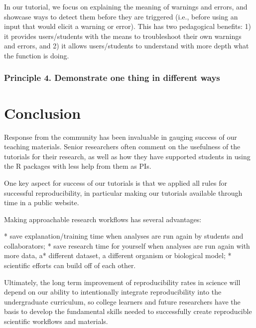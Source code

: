 \documentclass[12pt]{article}
\begin{document}
In our tutorial, we focus on explaining the meaning of warnings and errors, and
 showcase ways to detect them before they are triggered (i.e., before using an input
  that would elicit a warning or error). This has two pedagogical benefits:
1) it provides users/students with the means to troubleshoot their own warnings and errors, and
2) it allows users/students to understand with more depth what the function is doing.





\subsubsection*{Principle 4. Demonstrate one thing in different ways}








\section*{Conclusion}
\label{sec:conclusion}

Response from the community has been invaluable in gauging success of our teaching
materials.
Senior researchers often comment on the usefulness
of the tutorials for their research, as well as how they have supported students in using the
R packages with less help from them as PIs.

One key aspect for success of our tutorials is that we applied all rules for
successful reproducibility, in particular making our tutorials available
through time in a public website.

Making approachable research workflows has several advantages:

* save explanation/training time when analyses are run again by students and collaborators;
* save research time for yourself when analyses are run again with more data, a* different dataset, a different organism or biological model;
* scientific efforts can build off of each other.

Ultimately, the long term improvement of reproducibility rates in science will depend
on our ability to intentionally integrate reproducibility into the
undergraduate curriculum, so college learners and future researchers have the
basis to develop the fundamental skills needed to successfully create reproducible
scientific workflows and materials.
\end{document}
